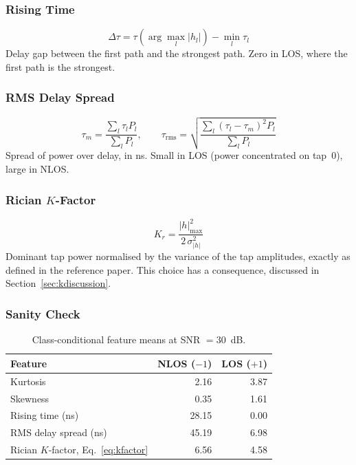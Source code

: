 \documentclass[11pt,a4paper]{article}
\begin{document}
\subsubsection{Rising Time}
\vspace{-0.6em}
\begin{equation}
\Delta\tau = \tau\!\left(\arg\max_l |h_l|\right) - \min_l \tau_l
\end{equation}
Delay gap between the first path and the strongest path. Zero in LOS, where the first path is
the strongest.

\subsubsection{RMS Delay Spread}
\vspace{-0.6em}
\begin{equation}
\tau_m = \frac{\sum_l \tau_l P_l}{\sum_l P_l},
\qquad
\tau_{\mathrm{rms}} = \sqrt{\frac{\sum_l (\tau_l - \tau_m)^2 P_l}{\sum_l P_l}}
\end{equation}
Spread of power over delay, in ns. Small in LOS (power concentrated on tap~0), large in NLOS.

\subsubsection{Rician $K$-Factor}
\vspace{-0.6em}
\begin{equation}
K_r = \frac{|h|^2_{\max}}{2\,\sigma^2_{|h|}}
\label{eq:kfactor}
\end{equation}
Dominant tap power normalised by the variance of the tap amplitudes, exactly as defined in the
reference paper. This choice has a consequence, discussed in Section~\ref{sec:kdiscussion}.

\subsubsection{Sanity Check}

\begin{table}[H]
\centering
\caption{Class-conditional feature means at SNR $=30$~dB.}
\label{tab:featuremeans}
\begin{tabular}{lrr}
\toprule
Feature & NLOS ($-1$) & LOS ($+1$) \\
\midrule
Kurtosis                    & 2.16  & 3.87 \\
Skewness                    & 0.35  & 1.61 \\
Rising time (ns)            & 28.15 & 0.00 \\
RMS delay spread (ns)       & 45.19 & 6.98 \\
Rician $K$-factor, Eq.~\eqref{eq:kfactor} & 6.56 & 4.58 \\
\bottomrule
\end{tabular}
\end{table}
\end{document}
